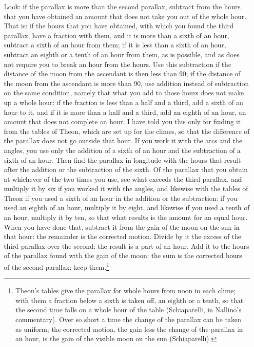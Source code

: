 \documentclass[11pt]{article}
\newcommand{\ArPage}[1]{\marginpar{\footnotesize\color{gray}Ar.\,p.\,#1}}
\begin{document}
\par \ArPage{159}Look: if the parallax is more than the second parallax, subtract from the hours that you have obtained an amount that does not take you out of the whole hour. That is: if the hours that you have obtained, with which you found the third parallax, have a fraction with them, and it is more than a sixth of an hour, subtract a sixth of an hour from them; if it is less than a sixth of an hour, subtract an eighth or a tenth of an hour from them, as is possible, and as does not require you to break an hour from the hours. Use this subtraction if the distance of the moon from the ascendant is then less than 90; if the distance of the moon from the ascendant is more than 90, use addition instead of subtraction on the same condition, namely that what you add to those hours does not make up a whole hour: if the fraction is less than a half and a third, add a sixth of an hour to it, and if it is more than a half and a third, add an eighth of an hour, an amount that does not complete an hour. I have told you this only for finding it from the tables of Theon, which are set up for the climes, so that the difference of the parallax does not go outside that hour. If you work it with the arcs and the angles, you use only the addition of a sixth of an hour and the subtraction of a sixth of an hour. Then find the parallax in longitude with the hours that result after the addition or the subtraction of the sixth. Of the parallax that you obtain at whichever of the two times you use, see what exceeds the third parallax, and multiply it by six if you worked it with the angles, and likewise with the tables of Theon if you used a sixth of an hour in the addition or the subtraction; if you used an eighth of an hour, multiply it by eight, and likewise if you used a tenth of an hour, multiply it by ten, so that what results is the amount for an equal hour. When you have done that, subtract it from the gain of the moon on the sun in that hour: the remainder is the corrected motion. Divide by it the excess of the third parallax over the second: the result is a part of an hour. Add it to the hours of the parallax found with the gain of the moon: the sum is the corrected hours of the second parallax; keep them.\footnote{Theon's tables give the parallax for whole hours from noon in each clime; with them a fraction below a sixth is taken off, an eighth or a tenth, so that the second time falls on a whole hour of the table (Schiaparelli, in Nallino's commentary). Over so short a time the change of the parallax can be taken as uniform; the corrected motion, the gain less the change of the parallax in an hour, is the gain of the visible moon on the sun (Schiaparelli).}\par
\end{document}

